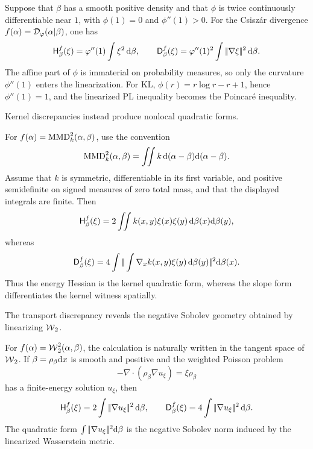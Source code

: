 \begin{example}\label{ex-linearized-discrepancy-forms}\label{ex-linearized-phi-divergence-forms}
	Suppose that \(\beta\) has a smooth positive density and that \(\phi\) is twice continuously differentiable near \(1\), with \(\phi(1)=0\) and \(\phi''(1)>0\). For the Csisz\'ar divergence \(f(\alpha)=\mathcal{D}_\varphi(\alpha|\beta)\), one has
	\[
		\mathsf H^f_\beta(\xi)
		=
		\varphi''(1)\int \xi^2\,\mathrm{d}\beta,
		\qquad
		\mathsf D^f_\beta(\xi)
		=
		\varphi''(1)^2\int |\!| \nabla\xi |\!|^2\,\mathrm{d}\beta.
	\]
	The affine part of \(\phi\) is immaterial on probability measures, so only the curvature \(\phi''(1)\) enters the linearization. For KL, \(\phi(r)=r\log r-r+1\), hence \(\phi''(1)=1\), and the linearized PL inequality becomes the Poincar\'e inequality.
\end{example}

Kernel discrepancies instead produce nonlocal quadratic forms.

\begin{example}\label{ex-linearized-mmd-forms}
	For \(f(\alpha)=\operatorname{MMD}_k^2(\alpha,\beta)\), use the convention
	\[
		\operatorname{MMD}_k^2(\alpha,\beta)
		=
		\iint k\,\mathrm{d}(\alpha-\beta)\mathrm{d}(\alpha-\beta).
	\]
	Assume that \(k\) is symmetric, differentiable in its first variable, and positive semidefinite on signed measures of zero total mass, and that the displayed integrals are finite. Then
	\[
		\mathsf H^f_\beta(\xi)
		=
		2\iint k(x,y)\xi(x)\xi(y)\,\mathrm{d}\beta(x)\mathrm{d}\beta(y),
	\]
	whereas
	\[
		\mathsf D^f_\beta(\xi)
		=
		4\int
		|\!| \int \nabla_x k(x,y)\xi(y)\,\mathrm{d}\beta(y) |\!|^2
		\mathrm{d}\beta(x).
	\]
	Thus the energy Hessian is the kernel quadratic form, whereas the slope form differentiates the kernel witness spatially.
\end{example}

The transport discrepancy reveals the negative Sobolev geometry obtained by linearizing \(\operatorname{\mathcal{W}}_2\).

\begin{example}\label{ex-linearized-wasserstein-forms}
	For \(f(\alpha)=\operatorname{\mathcal{W}}_2^2(\alpha,\beta)\), the calculation is naturally written in the tangent space of \(\operatorname{\mathcal{W}}_2\). If \(\beta=\rho_\beta\mathrm{d} x\) is smooth and positive and the weighted Poisson problem
	\[
		-\nabla\cdot(\rho_\beta\nabla u_\xi)=\xi\rho_\beta
	\]
	has a finite-energy solution \(u_\xi\), then
	\[
		\mathsf H^f_\beta(\xi)
		=
		2\int|\!| \nabla u_\xi |\!|^2\,\mathrm{d}\beta,
		\qquad
		\mathsf D^f_\beta(\xi)
		=
		4\int|\!| \nabla u_\xi |\!|^2\,\mathrm{d}\beta.
	\]
	The quadratic form \(\int|\!| \nabla u_\xi |\!|^2\mathrm{d}\beta\) is the negative Sobolev norm induced by the linearized Wasserstein metric.
\end{example}

